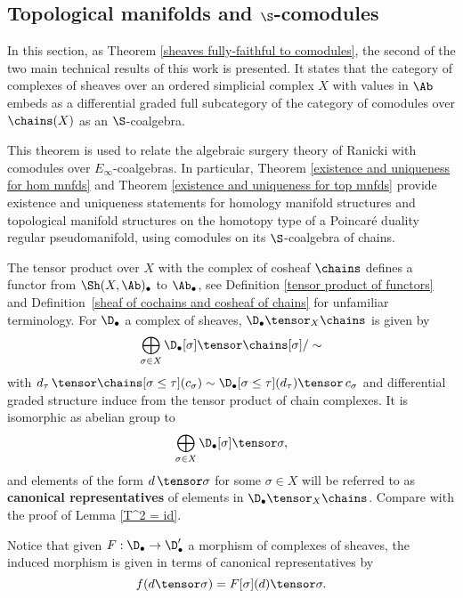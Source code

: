 
%

\subsection{Topological manifolds and $\S$-comodules}

In this section, as Theorem \ref{sheaves fully-faithful to comodules}, the second of the two main technical results of this work is presented. It states that the category of complexes of sheaves over an ordered simplicial complex $X$ with values in $\Ab$ embeds as a differential graded full subcategory of the category of comodules over $\chains(X)$ as an $\S$-coalgebra.

This theorem is used to relate the algebraic surgery theory of Ranicki with comodules over $E_\infty$-coalgebras. In particular, Theorem \ref{existence and uniqueness for hom mnfds} and Theorem \ref{existence and uniqueness for top mnfds} provide existence and uniqueness statements for homology manifold structures and topological manifold structures on the homotopy type of a Poincar\'e duality regular pseudomanifold, using comodules on its $\S$-coalgebra of chains.

\begin{notation}
The tensor product over $X$ with the complex of cosheaf $\chains$ defines a functor from $\Sh(X,\Ab)_\bullet$ to $\Ab_\bullet$, see Definition \ref{tensor product of functors} and Definition~\ref{sheaf of cochains and cosheaf of chains} for unfamiliar terminology. For $\D_\bullet$ a complex of sheaves, $\D_\bullet\tensor_X\chains$ is given by
$$\bigoplus_{\sigma\in X}\D_\bullet[\sigma]\tensor\chains[\sigma]/\sim$$
with $d_\tau\,\tensor\chains[\sigma\leq\tau](c_\sigma)\sim \D_\bullet[\sigma\leq\tau](d_\tau)\tensor\,c_\sigma$ and differential graded structure induce from the tensor product of chain complexes. It is isomorphic as abelian group to
$$\bigoplus_{\sigma\in X}\D_\bullet[\sigma]\tensor\sigma,$$ and elements of the form $d\,\tensor\sigma$ for some $\sigma\in X$ will be referred to as \textbf{canonical representatives} of elements in $\D_\bullet\tensor_X\chains$. Compare with the proof of Lemma \ref{T^2 = id}.

Notice that given $F:\D_\bullet\to\D'_\bullet$ a morphism of complexes of sheaves, the induced morphism is given in terms of canonical representatives by $$f(d\tensor\sigma)=F[\sigma](d)\tensor\sigma.$$
\end{notation}

